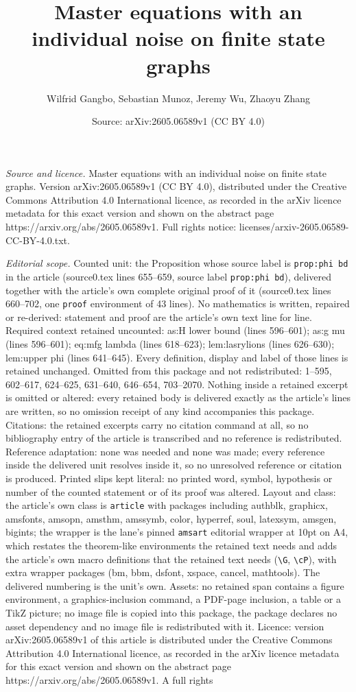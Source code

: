 \documentclass[10pt,a4paper]{amsart}
\title[Master equations with an individual noise on finite state gr]{Master equations with an individual noise on finite state graphs}
\author{Wilfrid Gangbo, Sebastian Munoz, Jeremy Wu, Zhaoyu Zhang}
\date{Source: arXiv:2605.06589v1 (CC BY 4.0)}
\begin{document}
\maketitle

\noindent\emph{Source and licence.} Master equations with an individual noise on finite state graphs. Version arXiv:2605.06589v1 (CC BY 4.0), distributed under the Creative Commons Attribution 4.0 International licence, as recorded in the arXiv licence metadata for this exact version and shown on the abstract page https://arxiv.org/abs/2605.06589v1. Full rights notice: licenses/arxiv-2605.06589-CC-BY-4.0.txt.\par\smallskip

\noindent\textit{Editorial scope.} Counted unit: the Proposition whose source label is \texttt{prop:phi bd} in the article (source0.tex lines 655--659, source label \texttt{prop:phi bd}), delivered together with the article's own complete original proof of it (source0.tex lines 660--702, one \texttt{proof} environment of 43 lines). No mathematics is written, repaired or re-derived: statement and proof are the article's own text line for line. Required context retained uncounted: as:H lower bound (lines 596--601); as:g mu (lines 596--601); eq:mfg lambda (lines 618--623); lem:lasrylions (lines 626--630); lem:upper phi (lines 641--645). Every definition, display and label of those lines is retained unchanged. Omitted from this package and not redistributed: 1--595, 602--617, 624--625, 631--640, 646--654, 703--2070. Nothing inside a retained excerpt is omitted or altered: every retained body is delivered exactly as the article's lines are written, so no omission receipt of any kind accompanies this package. Citations: the retained excerpts carry no citation command at all, so no bibliography entry of the article is transcribed and no reference is redistributed. Reference adaptation: none was needed and none was made; every reference inside the delivered unit resolves inside it, so no unresolved reference or citation is produced. Printed slips kept literal: no printed word, symbol, hypothesis or number of the counted statement or of its proof was altered. Layout and class: the article's own class is \texttt{article} with packages including authblk, graphicx, amsfonts, amsopn, amsthm, amssymb, color, hyperref, soul, latexsym, amsgen, bigints; the wrapper is the lane's pinned \texttt{amsart} editorial wrapper at 10pt on A4, which restates the theorem-like environments the retained text needs and adds the article's own macro definitions that the retained text needs (\texttt{\textbackslash G}, \texttt{\textbackslash cP}), with extra wrapper packages (bm, bbm, dsfont, xspace, cancel, mathtools). The delivered numbering is the unit's own. Assets: no retained span contains a figure environment, a graphics-inclusion command, a PDF-page inclusion, a table or a TikZ picture; no image file is copied into this package, the package declares no asset dependency and no image file is redistributed with it. Licence: version arXiv:2605.06589v1 of this article is distributed under the Creative Commons Attribution 4.0 International licence, as recorded in the arXiv licence metadata for this exact version and shown on the abstract page https://arxiv.org/abs/2605.06589v1. A full rights 
\end{document}
